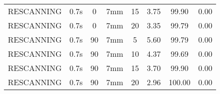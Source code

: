 \begin{table}[H]
\begin{tabular}{|c||c|c|c|c||c|c|c|}
RESCANNING & 0.7s & 0 & 7mm & 15 & 3.75 & 99.90 & 0.00 \\
RESCANNING & 0.7s & 0 & 7mm & 20 & 3.35 & 99.79 & 0.00 \\
RESCANNING & 0.7s & 90 & 7mm & 5 & 5.60 & 99.79 & 0.00 \\
RESCANNING & 0.7s & 90 & 7mm & 10 & 4.37 & 99.69 & 0.00 \\
RESCANNING & 0.7s & 90 & 7mm & 15 & 3.70 & 99.90 & 0.00 \\
RESCANNING & 0.7s & 90 & 7mm & 20 & 2.96 & 100.00 & 0.00 \\
    \hline\hline 
  \end{tabular}
  \label{tab:Pat05_RPV}
\end{table}


\newpage
\thispagestyle{realempty}
\vspace*{-2cm}

